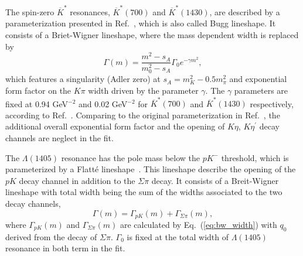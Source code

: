 The spin-zero $\overline{K}^*$ resonances, $\overline{K}^*(700)$ and $\overline{K}^*(1430)$, are described by a parameterization presented in Ref.~\cite{Bugg:2005xx}, which is also called Bugg lineshape. It consists of a Briet-Wigner lineshape, where the mass dependent width is replaced by
\begin{equation}
    \Gamma(m) = \frac{m^2-s_A}{m_0^2 - s_A}\Gamma_0e^{-\gamma m^2},
\end{equation}
which features a singularity (Adler zero) at $s_A = m_K^2 - 0.5m_\pi^2$ and exponential form factor on the $K\pi$ width driven by the parameter $\gamma$. The $\gamma$ parameters are fixed at 0.94 GeV$^{-2}$ and 0.02 GeV$^{-2}$ for $\overline{K}^*(700)$ and $\overline{K}^*(1430)$ respectively, according to Ref.~\cite{LHCb:2022ouv}. Comparing to the original parameterization in Ref.~\cite{Bugg:2005xx}, the additional overall exponential form factor and the opening of $K\eta$, $K\eta^\prime$ decay channels are neglect in the fit.

The $\Lambda(1405)$ resonance has the pole mass below the $pK^-$ threshold, which is parameterized by a Flatt\'e lineshape~\cite{Flatte:1976xu}. This lineshape describe the opening of the $pK$ decay channel in addition to the $\Sigma\pi$ decay. It consists of a Breit-Wigner lineshape with total width being the sum of the widths associated to the two decay channels,
\begin{equation}
    \Gamma(m) = \Gamma_{pK}(m) + \Gamma_{\Sigma\pi}(m),
\end{equation}
where $\Gamma_{pK}(m)$ and $\Gamma_{\Sigma\pi}(m)$ are calculated by Eq.~(\ref{eq:bw_width}) with $q_0$ derived from the decay of $\Sigma\pi$. $\Gamma_0$ is fixed at the total width of $\Lambda(1405)$ resonance in both term in the fit.
 

